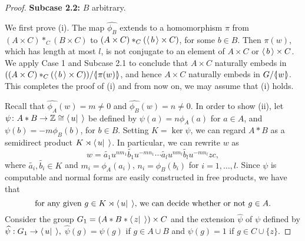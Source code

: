 \documentclass[12pt, a4paper]{amsart}
\theoremstyle{remark}
\theoremstyle{definition}
\begin{document}
\begin{proof}
\textbf{Subcase 2.2:} $B$ arbitrary.

We first prove (i). The map $\widehat{\phi_B}$ extends to a homomorphism $\pi$ from $(A\times C)*_C (B\times C)$ to $(A\times C)*_C( {\langle\mkern3mu{b}\mkern3mu\rangle}\times C)$, for some $b \in B$. Then $\pi(w)$, which has length at most $l$, is not conjugate to an element of $A\times C$ or ${\langle\mkern3mu{b}\mkern3mu\rangle} \times C$. We apply Case 1 and  Subcase 2.1 to conclude that $A\times C$ naturally embeds in $((A\times C)*_C( {\langle\mkern3mu{b}\mkern3mu\rangle}\times C))/{{\langle}{\mkern-3.7mu}{\lvert}{\mkern1.2mu}{{\pi(w)}}{\mkern1.2mu}{\rvert}{\mkern-3.7mu}{\rangle}}$, and hence $A\times C$ naturally embeds in  $G/{{\langle}{\mkern-3.7mu}{\lvert}{\mkern1.2mu}{{w}}{\mkern1.2mu}{\rvert}{\mkern-3.7mu}{\rangle}}$. This completes the proof of (i) and from now on, we may assume that (i) holds.

Recall that $\widehat{\phi_A}(w)=m\neq 0$ and $\widehat{\phi_B}(w)=n\neq 0.$ In order to show (ii), let $\psi\colon A*B\to {\mathbb{Z}}\cong{\langle\mkern3mu{u|\;}\mkern3mu\rangle}$ be defined by $\psi(a)=n\phi_A(a)$ for $a\in A$, and $\psi(b)=-m\phi_B(b)$, for $b\in B$. Setting $K=\ker \psi$, we can regard $A*B$ as a semidirect product $K\rtimes {\langle\mkern3mu{u|\;}\mkern3mu\rangle}$. In particular, we can rewrite $w$ as \begin{equation}\label{eq:winK}w=\tilde{a_1}u^{nm_1} \tilde{b_1}u^{-mn_1}\cdots  \tilde{a_l}u^{nm_l} \tilde{b_l}u^{-mn_l}zc,\end{equation}
where $\tilde{a_i},\tilde{b_i}\in K$ and $m_i=\phi_A(a_i)$, $n_i=\phi_B(b_i)$ for $i=1,\dots, l$. 
 Since $\psi$ is computable and normal forms are easily constructed in free products, we have that
\begin{equation}\label{eq:semidirect}
\text{for any given $g\in K\rtimes {\langle\mkern3mu{u|\;}\mkern3mu\rangle}$, we can decide whether or not $g\in A$.}
\end{equation}
Consider the group $G_1= (A*B*{\langle\mkern3mu{z|\;}\mkern3mu\rangle})\times C$ and the extension $\widehat{\psi}$ of $\psi$ defined by $\widehat{\psi}:G_1\to {\langle\mkern3mu{u|\;}\mkern3mu\rangle},$ $\widehat{\psi}(g)=\psi(g)$ if $g\in A\cup B$ and $\psi(g)=1$ if $g\in C\cup \{z\}$. 


\end{proof}
\end{document}
